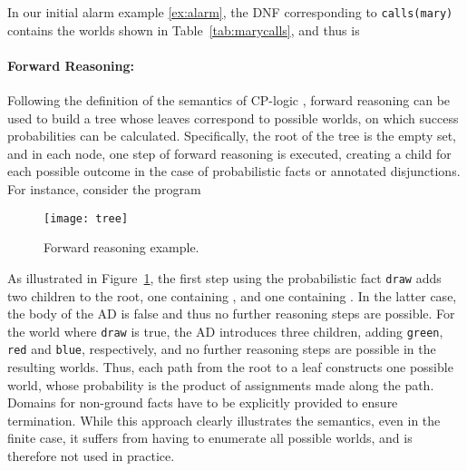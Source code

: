 \documentclass[a4paper]{article}
\begin{document}
In  our initial alarm  example \eqref{ex:alarm}, the DNF
corresponding to 
\verb|calls(mary)| contains the worlds shown in
Table~\ref{tab:marycalls}, and thus  is 
 


\paragraph{Forward Reasoning:} Following the definition of the semantics of CP-logic
\citep{vennekens:tplp09}, forward reasoning can be used to build a
tree whose leaves correspond to possible worlds, on which
success probabilities can be calculated. Specifically, the root of the
tree is the empty set, and in each node, one step of forward reasoning
is executed, creating a child for each possible outcome in the case of
probabilistic facts or annotated disjunctions. 
For instance, consider the program

\begin{figure}
\centering
\texttt{[image: tree]}
\caption{Forward reasoning example.}
\label{fig:cptree}
\end{figure}
As illustrated in Figure~\ref{fig:cptree},  the first step
using the probabilistic fact \verb|draw| adds two children to the
root, one containing , and
one containing .  In the latter case, the body of
the AD is false and thus no further reasoning steps are possible. For
the world where \verb|draw| is true, the AD introduces three children,
adding \verb|green|, \verb|red| and \verb|blue|, respectively, and no
further reasoning steps are possible in the resulting worlds. Thus, each path from the root to a
leaf constructs one possible world, whose probability is the product
of assignments made along the path. Domains for non-ground facts
have to be explicitly provided to ensure termination. 
While this approach clearly
illustrates the semantics, even in the finite case, it suffers from having to
enumerate all possible worlds, and is therefore not used in practice. 
\end{document}
